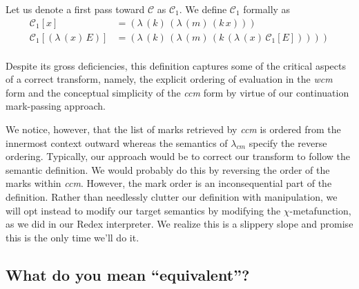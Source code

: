 \documentclass[ms,electronic,twosidetoc,letterpaper,chaptercenter,parttop]{byumsphd}
\newcommand{\pair}[2]{((\mathbf{pair}\,#1)\,#2)}
\newcommand{\Cone}[1]{\mathcal{C}_1[#1]}
\newcommand{\abs}[2]{(\lambda\,(#1)\,#2)}
\newcommand{\app}[2]{(#1\,#2)}
\newcommand{\wcm}[2]{(\mathrm{wcm}\,#1\,#2)}
\newcommand{\ccm}{(\mathrm{ccm})}
\begin{document}
Let us denote a first pass toward $\mathcal{C}$ as $\mathcal{C}_{1}$. We define 
$\mathcal{C}_{1}$ formally as 
\begin{align*}
\Cone{x}          &= \abs{k}{
                      \abs{m}{
                       \app{k}{x}}}\\
\Cone{\abs{x}{E}} &= \abs{k}{
                      \abs{m}{
                       \app{k}{
                        \abs{x}{\Cone{E}}}}}\\
\end{align*}

Despite its gross deficiencies, this definition captures some of the critical aspects of a
correct transform, namely, the explicit ordering of evaluation in the \emph{wcm} form and
the conceptual simplicity of the \emph{ccm} form by virtue of our continuation
mark-passing approach.

We notice, however, that the list of marks retrieved by \emph{ccm} is ordered from the
innermost context outward whereas the semantics of $\lambda_{cm}$ specify the reverse
ordering. Typically, our approach would be to correct our transform to follow the semantic
definition. We would probably do this by reversing the order of the marks within
\emph{ccm}. However, the mark order is an inconsequential part of the definition. Rather
than needlessly clutter our definition with manipulation, we will opt instead to modify
our target semantics by modifying the $\chi$-metafunction, as we did in our Redex
interpreter. We realize this is a slippery slope and promise this is the only time we'll
do it.

\subsection{What do you mean ``equivalent''?}
\end{document}
